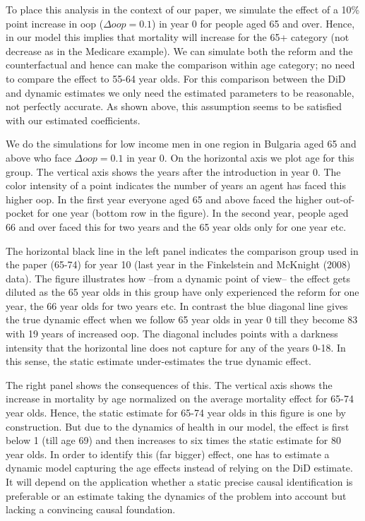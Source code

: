 \documentclass[a4paper,12pt]{article}
\makeatletter
\newcommand{\cslcitation}[2]
 {\protect\hyper@linkstart{cite}{citeproc_bib_item_#1}#2\hyper@linkend}
\makeatother
\begin{document}
To place this analysis in the context of our paper, we simulate the effect of a 10\% point increase in oop (\(\Delta oop = 0.1\)) in year 0 for people aged 65 and over. Hence, in our model this implies that mortality will increase for the 65+ category (not decrease as in the Medicare example). We can simulate both the reform and the counterfactual and hence can make the comparison within age category; no need to compare the effect to 55-64 year olds. For this comparison between the DiD and dynamic estimates we only need the estimated parameters to be reasonable, not perfectly accurate. As shown above, this assumption seems to be satisfied with our estimated coefficients.

We do the simulations for low income men in one region in Bulgaria aged 65 and above who face \(\Delta oop = 0.1\) in year 0. On the horizontal axis we plot age for this group. The vertical axis shows the years after the introduction in year 0. The color intensity of a point indicates the number of years an agent has faced this higher oop. In the first year everyone aged 65 and above faced the higher out-of-pocket for one year (bottom row in the figure). In the second year, people aged 66 and over faced this for two years and the 65 year olds only for one year etc.

The horizontal black line in the left panel indicates the comparison group used in the paper (65-74) for year 10 (last year in the Finkelstein and McKnight (\cslcitation{4}{2008}) data). The figure illustrates how --from a dynamic point of view-- the effect gets diluted as the 65 year olds in this group have only experienced the reform for one year, the 66 year olds for two years etc. In contrast the blue diagonal line gives the true dynamic effect when we follow 65 year olds in year 0 till they become 83 with 19 years of increased oop. The diagonal includes points with a darkness intensity that the horizontal line does not capture for any of the years 0-18. In this sense, the static estimate under-estimates the true dynamic effect.

The right panel shows the consequences of this. The vertical axis shows the increase in mortality by age normalized on the average mortality effect for 65-74 year olds. Hence, the static estimate for 65-74 year olds in this figure is one by construction. But due to the dynamics of health in our model, the effect is first below 1 (till age 69) and then increases to six times the static estimate for 80 year olds. In order to identify this (far bigger) effect, one has to estimate a dynamic model capturing the age effects instead of relying on the DiD estimate. It will depend on the application whether a static precise causal identification is preferable or an estimate taking the dynamics of the problem into account but lacking a convincing causal foundation.
\end{document}
